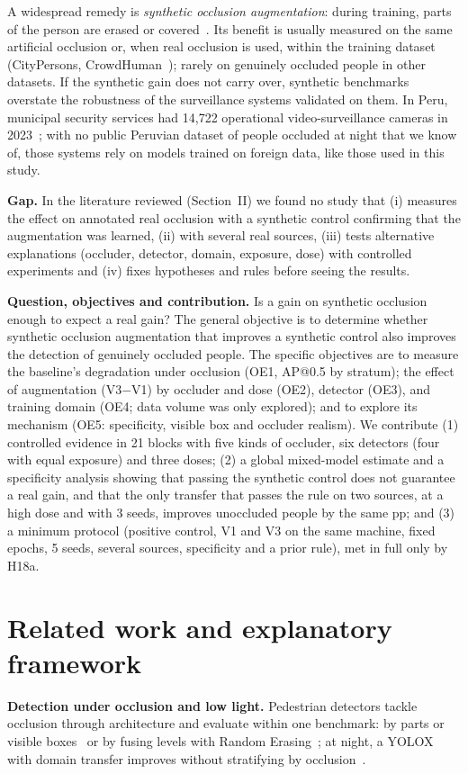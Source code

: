 \documentclass[conference]{IEEEtran}
\begin{document}
A widespread remedy is \emph{synthetic occlusion augmentation}: during training, parts of the person are erased or covered~\cite{Zhong2020,Shang2018synthocc,Chi2020pedhunter}. Its benefit is usually measured on the same artificial occlusion or, when real occlusion is used, within the training dataset (CityPersons, CrowdHuman~\cite{Shao2018crowdhuman}); rarely on genuinely occluded people in other datasets. If the synthetic gain does not carry over, synthetic benchmarks overstate the robustness of the surveillance systems validated on them. In Peru, municipal security services had 14,722 operational video-surveillance cameras in 2023~\cite{INEI2024renamu}; with no public Peruvian dataset of people occluded at night that we know of, those systems rely on models trained on foreign data, like those used in this study.

\textbf{Gap.} In the literature reviewed (Section~II) we found no study that (i) measures the effect on annotated real occlusion with a synthetic control confirming that the augmentation was learned, (ii) with several real sources, (iii) tests alternative explanations (occluder, detector, domain, exposure, dose) with controlled experiments and (iv) fixes hypotheses and rules before seeing the results.

\textbf{Question, objectives and contribution.} Is a gain on synthetic occlusion enough to expect a real gain? The general objective is to determine whether synthetic occlusion augmentation that improves a synthetic control also improves the detection of genuinely occluded people. The specific objectives are to measure the baseline's degradation under occlusion (OE1, AP@0.5 by stratum); the effect of augmentation (V3$-$V1) by occluder and dose (OE2), detector (OE3), and training domain (OE4; data volume was only explored); and to explore its mechanism (OE5: specificity, visible box and occluder realism). We contribute (1) controlled evidence in 21 blocks with five kinds of occluder, six detectors (four with equal exposure) and three doses; (2) a global mixed-model estimate and a specificity analysis showing that passing the synthetic control does not guarantee a real gain, and that the only transfer that passes the rule on two sources, at a high dose and with 3 seeds, improves unoccluded people by the same pp; and (3) a minimum protocol (positive control, V1 and V3 on the same machine, fixed epochs, 5 seeds, several sources, specificity and a prior rule), met in full only by H18a.

\section{Related work and explanatory framework}
\textbf{Detection under occlusion and low light.} Pedestrian detectors tackle occlusion through architecture and evaluate within one benchmark: by parts or visible boxes~\cite{Zhang2018orcnn,Zhou2018bibox,Song2022prnet} or by fusing levels with Random Erasing~\cite{Huan2023mlffcsp}; at night, a YOLOX with domain transfer improves without stratifying by occlusion~\cite{Yi2022yolox}.
\end{document}
